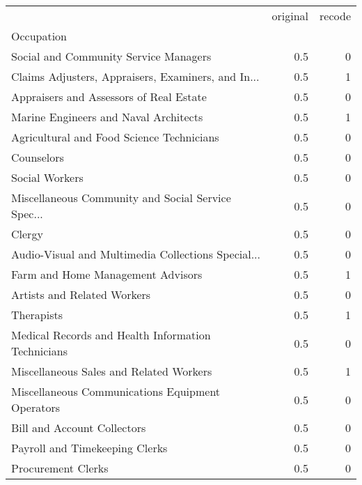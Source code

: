 
\begin{table}
\begin{tabular}{lrr}
\toprule
{} &  original &  recode \\
Occupation                                          &               &         \\
\midrule
Social and Community Service Managers              &           0.5 &       0 \\
Claims Adjusters, Appraisers, Examiners, and In... &           0.5 &       1 \\
Appraisers and Assessors of Real Estate            &           0.5 &       0 \\
Marine Engineers and Naval Architects              &           0.5 &       1 \\
Agricultural and Food Science Technicians          &           0.5 &       0 \\
Counselors                                         &           0.5 &       0 \\
Social Workers                                     &           0.5 &       0 \\
Miscellaneous Community and Social Service Spec... &           0.5 &       0 \\
Clergy                                             &           0.5 &       0 \\
Audio-Visual and Multimedia Collections Special... &           0.5 &       0 \\
Farm and Home Management Advisors                  &           0.5 &       1 \\
Artists and Related Workers                        &           0.5 &       0 \\
Therapists                                         &           0.5 &       1 \\
Medical Records and Health Information Technicians &           0.5 &       0 \\
Miscellaneous Sales and Related Workers            &           0.5 &       1 \\
Miscellaneous Communications Equipment Operators   &           0.5 &       0 \\
Bill and Account Collectors                        &           0.5 &       0 \\
Payroll and Timekeeping Clerks                     &           0.5 &       0 \\
Procurement Clerks                                 &           0.5 &       0 \\

\end{tabular}
\end{table}

